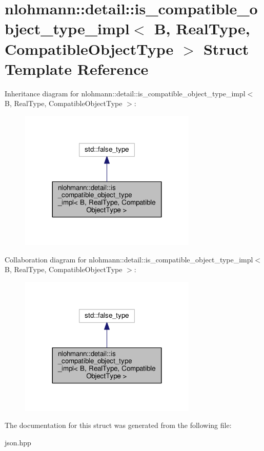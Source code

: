 \hypertarget{structnlohmann_1_1detail_1_1is__compatible__object__type__impl}{}\section{nlohmann\+:\+:detail\+:\+:is\+\_\+compatible\+\_\+object\+\_\+type\+\_\+impl$<$ B, Real\+Type, Compatible\+Object\+Type $>$ Struct Template Reference}
\label{structnlohmann_1_1detail_1_1is__compatible__object__type__impl}


Inheritance diagram for nlohmann\+:\+:detail\+:\+:is\+\_\+compatible\+\_\+object\+\_\+type\+\_\+impl$<$ B, Real\+Type, Compatible\+Object\+Type $>$\+:
\nopagebreak
\begin{figure}[H]
\begin{center}
\leavevmode
\includegraphics[width=239pt]{structnlohmann_1_1detail_1_1is__compatible__object__type__impl__inherit__graph}
\end{center}
\end{figure}


Collaboration diagram for nlohmann\+:\+:detail\+:\+:is\+\_\+compatible\+\_\+object\+\_\+type\+\_\+impl$<$ B, Real\+Type, Compatible\+Object\+Type $>$\+:
\nopagebreak
\begin{figure}[H]
\begin{center}
\leavevmode
\includegraphics[width=239pt]{structnlohmann_1_1detail_1_1is__compatible__object__type__impl__coll__graph}
\end{center}
\end{figure}


The documentation for this struct was generated from the following file\+:\begin{DoxyCompactItemize}
\item 
json.\+hpp\end{DoxyCompactItemize}
